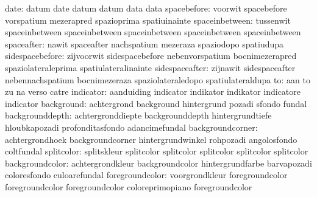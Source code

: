                      date: datum                     date
                           datum                     datum
                           data                      data
              spacebefore: voorwit                   spacebefore
                           vorspatium                mezerapred
                           spazioprima               spatiuinainte
           spaceinbetween: tussenwit                 spaceinbetween
                           spaceinbetween            spaceinbetween
                           spaceinbetween            spaceinbetween
               spaceafter: nawit                     spaceafter
                           nachspatium               mezeraza
                           spaziodopo                spatiudupa
          sidespacebefore: zijvoorwit                sidespacebefore
                           nebenvorspatium           bocnimezerapred
                           spaziolateraleprima       spatiulateralinainte
           sidespaceafter: zijnawit                  sidespaceafter
                           nebennachspatium          bocnimezeraza
                           spaziolateraledopo        spatiulateraldupa
                       to: aan                       to
                           zu                        na
                           verso                     catre
                indicator: aanduiding                indicator
                           indikator                 indikator
                           indicatore                indicator
               background: achtergrond               background
                           hintergrund               pozadi
                           sfondo                    fundal
          backgrounddepth: achtergronddiepte         backgrounddepth
                           hintergrundtiefe          hloubkapozadi
                           profonditasfondo          adancimefundal
         backgroundcorner: achtergrondhoek           backgroundcorner
                           hintergrundwinkel         rohpozadi
                           angolosfondo              coltfundal
 splitcolor: splitskleur splitcolor
             splitcolor  splitcolor
             splitcolor  splitcolor
          backgroundcolor: achtergrondkleur          backgroundcolor
                           hintergrundfarbe          barvapozadi
                           coloresfondo              culoarefundal
          foregroundcolor: voorgrondkleur            foregroundcolor
                           foregroundcolor           foregroundcolor
                           coloreprimopiano          foregroundcolor
